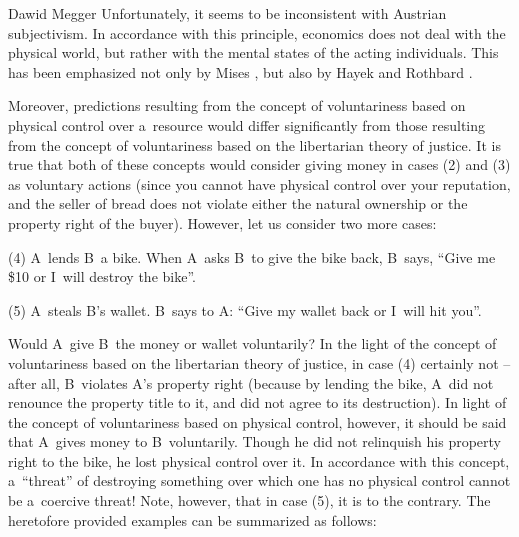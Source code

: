 \begin{artengenv}{Dawid Megger}
Unfortunately, it seems to be inconsistent with Austrian subjectivism. In accordance with this principle, economics does not deal with the physical world, but rather with the mental states of the acting individuals. This has been emphasized not only by Mises 
\parencite*[][p.92]{mises_human_1998}, %
 but also by Hayek 
\parencite*[][]{hayek_counter-revolution_1952} %
 and Rothbard 
\parencite*[][p.289]{rothbard-present}.%




Moreover, predictions resulting from the concept of voluntariness based on physical control over a~resource would differ significantly from those resulting from the concept of voluntariness based on the libertarian theory of justice. It is true that both of these concepts would consider giving money in cases (2) and (3) as voluntary actions (since you cannot have physical control over your reputation, and the seller of bread does not violate either the natural ownership or the property right of the buyer). However, let us consider two more cases:



\medskip

\noindent (4) A~lends B~a bike. When A~asks B~to give the bike back, B~says, ``Give me \$10 or I~will destroy the bike''.

\noindent (5) A~steals B's wallet. B~says to A: ``Give my wallet back or I~will hit you''.

\medskip


Would A~give B~the money or wallet voluntarily? In the light of the concept of voluntariness based on the libertarian theory of justice, in case (4) certainly not -- after all, B~violates A's property right (because by lending the bike, A~did not renounce the property title to it, and did not agree to its destruction). In light of the concept of voluntariness based on physical control, however, it should be said that A~gives money to B~voluntarily. Though he did not relinquish his property right to the bike, he lost physical control over it. In accordance with this concept, a~``threat'' of destroying something over which one has no physical control cannot be a~coercive threat! Note, however, that in case (5), it is to the contrary. The heretofore provided examples can be summarized as follows:








\end{artengenv}
